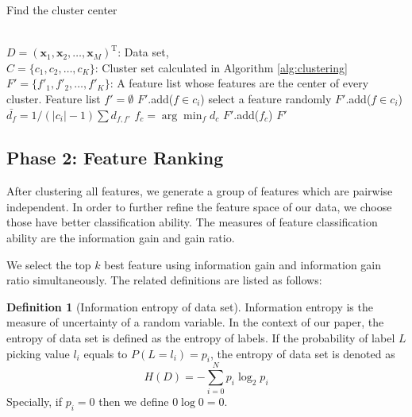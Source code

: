\documentclass{ieeeaccess}
\theoremstyle{definition}
\newtheorem{defn}{Definition}
\begin{document}
\begin{algorithm}
    \caption{Find the cluster center}
    \label{alg:find-cluster-center}
    \begin{algorithmic}[1]
    \REQUIRE ~~\\
        $D=(\bm{x}_1,\bm{x}_2,\ldots,\bm{x}_M)^\text{T}$: Data set, \\
        $C=\{c_1, c_2, \ldots, c_K\}$: Cluster set calculated in Algorithm \ref{alg:clustering}
    \ENSURE ~~\\
        $F'=\{f'_1, f'_2, \ldots, f'_K\}$: A feature list whose features are the center of every cluster.
    \STATE Feature list $f'=\emptyset$
            \STATE $F'$.add($f \in c_i$)
                \STATE select a feature randomly
                \STATE $F'$.add($f \in c_i$)
        \ELSE
                \STATE $\bar{d_f}=1/(|c_i|-1)\sum d_{f, f'}$
            \ENDFOR
            \STATE $f_c=\arg\min_f d_c$
            \STATE $F'$.add($f_c$)
        \ENDIF
    \ENDFOR
    \RETURN $F'$
    \end{algorithmic}
\end{algorithm}
        

\subsection{Phase 2: Feature Ranking}

After clustering all features, we generate a group of features which are pairwise independent. In order to further refine the feature space of our data, we choose those have better classification ability. The measures of feature classification ability are the information gain and gain ratio.

We select the top $k$ best feature using information gain and information gain ratio simultaneously. The related definitions are listed as follows:

\begin{defn}[Information entropy of data set]
    Information entropy\cite{Shannon1948} is the measure of uncertainty of a random variable. In the context of our paper, the entropy of data set is defined as the entropy of labels. If the probability of label $L$ picking value $l_i$ equals to $P(L=l_i)=p_i$, the entropy of data set is denoted as
\begin{equation}
    H(D) = -\sum_{i=0}^N p_i \log_2 p_i
\end{equation}
    Specially, if $p_i=0$ then we define $0\log0 = 0$.
\end{defn}
\end{document}
